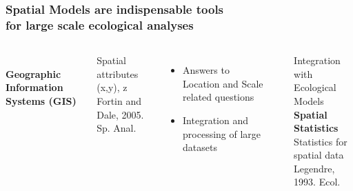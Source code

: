 \documentclass[10pt, compress]{beamer}
\begin{document}

\begin{frame}[fragile]
  \frametitle{Spatial Models are indispensable tools \protect\\ for large scale ecological analyses}
  \begin{columns}
  \column{5cm}
   {\vspace{-1.2cm}\\\centering \textbf{Geographic Information Systems (GIS)}\\}
  \vspace{5pt}
   {\alert{Spatial attributes (x,y), z} \\
     \hspace{1cm} \footnotesize Fortin and Dale, 2005. Sp. Anal.\\ \normalsize
     \vspace{5pt}
     \raggedright \begin{itemize}
     \item Answers to Location and Scale related questions\\
     \item Integration and processing of large datasets\\
     \end{itemize}\\ \vspace{10pt}}
      {\alert{\Large Integration with Ecological Models}}
  \column{5cm}
   {\vspace{2pt}\\ \centering \textbf{Spatial Statistics}\\}
  \vspace{5pt}
   {\alert{Statistics for spatial data}\\
     \hspace{1cm} \footnotesize Legendre, 1993. Ecol.\\ \normalsize
     \vspace{5pt}}
\end{columns}
\end{frame}
\end{document}
